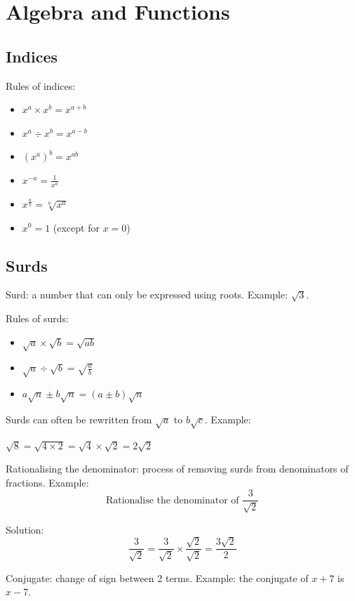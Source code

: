 \documentclass[a4paper]{report}
\begin{document}
\chapter{Algebra and Functions}

\section{Indices}

Rules of indices:

\begin{itemize}
	\item{\( x^a \times x^b = x^{a + b} \)}
	\item{\( x^a \div x^b = x^{a - b} \)}
	\item{\( (x^a)^b = x^{ab} \)}
	\item{\( x^{-a} = \frac{1}{x^a} \)}
	\item{\( x^{\frac{a}{b}} = \sqrt[b]{x^a} \)}
	\item{\( x^0 = 1 \) (except for \( x = 0 \))}
\end{itemize}

\section{Surds}

Surd: a number that can only be expressed using roots. Example: \( \sqrt{3} \).

Rules of surds:

\begin{itemize}
	\item{\( \sqrt{a} \times \sqrt{b} = \sqrt{ab} \)}
	\item{\( \sqrt{a} \div \sqrt{b} = \sqrt{\frac{a}{b}} \)}
	\item{\( a\sqrt{n} \pm b\sqrt{n} = (a \pm b)\sqrt{n} \)}
\end{itemize}

Surds can often be rewritten from \( \sqrt{a} \) to \( b\sqrt{c} \). Example:

\( \sqrt{8} = \sqrt{4 \times 2} = \sqrt{4} \times \sqrt{2} = 2\sqrt{2} \)

Rationalising the denominator: process of removing surds from denominators of fractions. Example:
\[ \text{Rationalise the denominator of } \frac{3}{\sqrt{2}} \]

Solution: \[ \frac{3}{\sqrt{2}} = \frac{3}{\sqrt{2}} \times \frac{\sqrt{2}}{\sqrt{2}} =
\frac{3\sqrt{2}}{2} \]

Conjugate: change of sign between 2 terms. Example: the conjugate of \( x + 7 \) is \( x - 7 \).
\end{document}
